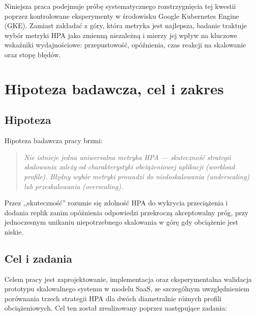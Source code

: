 Niniejsza praca podejmuje próbę systematycznego rozstrzygnięcia tej kwestii poprzez kontrolowane eksperymenty w środowisku Google Kubernetes Engine (GKE). Zamiast zakładać z góry, która metryka jest najlepsza, badanie traktuje wybór metryki HPA jako zmienną niezależną i mierzy jej wpływ na kluczowe wskaźniki wydajnościowe: przepustowość, opóźnienia, czas reakcji na skalowanie oraz stopę błędów.

\section{Hipoteza badawcza, cel i zakres}

\subsection{Hipoteza}

Hipoteza badawcza pracy brzmi:

\begin{quote}
\textit{Nie istnieje jedna uniwersalna metryka HPA --- skuteczność strategii skalowania zależy od charakterystyki obciążeniowej aplikacji (workload profile). Błędny wybór metryki prowadzi do niedoskalowania (underscaling) lub przeskalowania (overscaling).}
\end{quote}

Przez ,,skuteczność'' rozumie się zdolność HPA do wykrycia przeciążenia i dodania replik zanim opóźnienia odpowiedzi przekroczą akceptowalny próg, przy jednoczesnym unikaniu niepotrzebnego skalowania w górę gdy obciążenie jest niskie.

\subsection{Cel i zadania}

Celem pracy jest zaprojektowanie, implementacja oraz eksperymentalna walidacja prototypu skalowalnego systemu w modelu SaaS, ze szczególnym uwzględnieniem porównania trzech strategii HPA dla dwóch diametralnie różnych profili obciążeniowych. Cel ten został zrealizowany poprzez następujące zadania:

